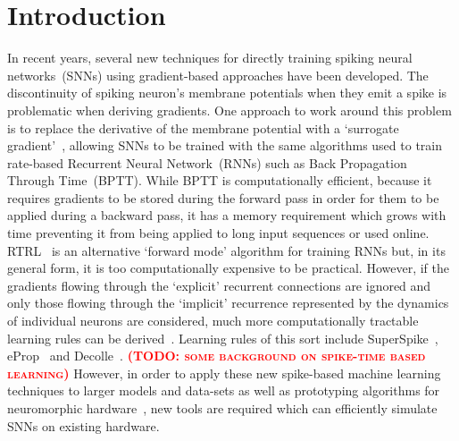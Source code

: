 \documentclass[sigconf,authordraft]{acmart}
\newcommand{\todo}[1]{\textbf{\textsc{\textcolor{red}{(TODO: #1)}}}}
\begin{document}


\maketitle

\section{Introduction}
In recent years, several new techniques for directly training spiking neural networks~(SNNs) using gradient-based approaches have been developed.
The discontinuity of spiking neuron's membrane potentials when they emit a spike is problematic when deriving gradients.
One approach to work around this problem is to replace the derivative of the membrane potential with a `surrogate gradient'~\citep{Bohte2011,Bellec2018,Zenke2021a}, allowing SNNs to be trained with the same algorithms used to train rate-based Recurrent Neural Network~(RNNs) such as Back Propagation Through Time~(BPTT).
While BPTT is computationally efficient, because it requires gradients to be stored during the forward pass in order for them to be applied during a backward pass, it has a memory requirement which grows with time preventing it from being applied to long input sequences or used online.
RTRL~\citep{Williams1989} is an alternative `forward mode' algorithm for training RNNs but, in its general form, it is too computationally expensive to be practical.
However, if the gradients flowing through the `explicit' recurrent connections are ignored and only those flowing through the `implicit' recurrence represented by the dynamics of individual neurons are considered, much more computationally tractable learning rules can be derived~\citep{Zenke2021}.
Learning rules of this sort include SuperSpike~\citep{Zenke2018}, eProp~\citep{Bellec2018} and Decolle~\citep{Kaiser2020}.
\todo{some background on spike-time based learning}
However, in order to apply these new spike-based machine learning techniques to larger models and data-sets as well as prototyping algorithms for neuromorphic hardware~\citep{Davies2018,Furber2014,Merolla2014}, new tools are required which can efficiently simulate SNNs on existing hardware. 
\end{document}
